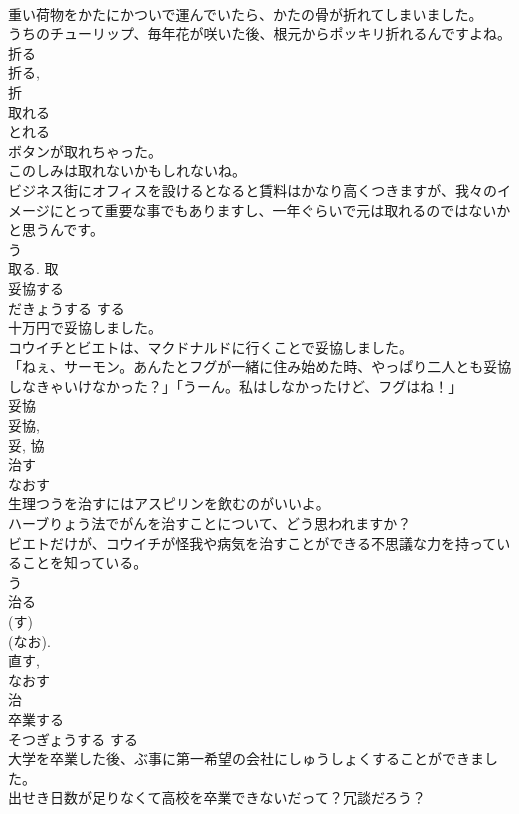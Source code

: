 \documentclass[8pt]{extreport}
\begin{document}
\begin{CJK}{UTF8}{min}
\\	重い荷物をかたにかついで運んでいたら、かたの骨が折れてしまいました。	
\\	うちのチューリップ、毎年花が咲いた後、根元からポッキリ折れるんですよね。	
\\	折る 
\\	折る, 
\\	折	
\\	取れる	
\\	とれる	
\\	ボタンが取れちゃった。	
\\	このしみは取れないかもしれないね。	
\\	ビジネス街にオフィスを設けるとなると賃料はかなり高くつきますが、我々のイメージにとって重要な事でもありますし、一年ぐらいで元は取れるのではないかと思うんです。	
\\	う 
\\	取る.	取	
\\	妥協する	
\\	だきょうする	する 
\\	十万円で妥協しました。	
\\	コウイチとビエトは、マクドナルドに行くことで妥協しました。	
\\	「ねぇ、サーモン。あんたとフグが一緒に住み始めた時、やっぱり二人とも妥協しなきゃいけなかった？」「うーん。私はしなかったけど、フグはね！」	
\\	妥協 
\\	妥協, 
\\	妥, 協	
\\	治す	
\\	なおす	
\\	生理つうを治すにはアスピリンを飲むのがいいよ。	
\\	ハーブりょう法でがんを治すことについて、どう思われますか？	
\\	ビエトだけが、コウイチが怪我や病気を治すことができる不思議な力を持っていることを知っている。	
\\	う 
\\	治る 
\\	(す) 
\\	(なお). 
\\	直す, 
\\	なおす 
\\	治	
\\	卒業する	
\\	そつぎょうする	する 
\\	大学を卒業した後、ぶ事に第一希望の会社にしゅうしょくすることができました。	
\\	出せき日数が足りなくて高校を卒業できないだって？冗談だろう？	

\end{CJK}
\end{document}
